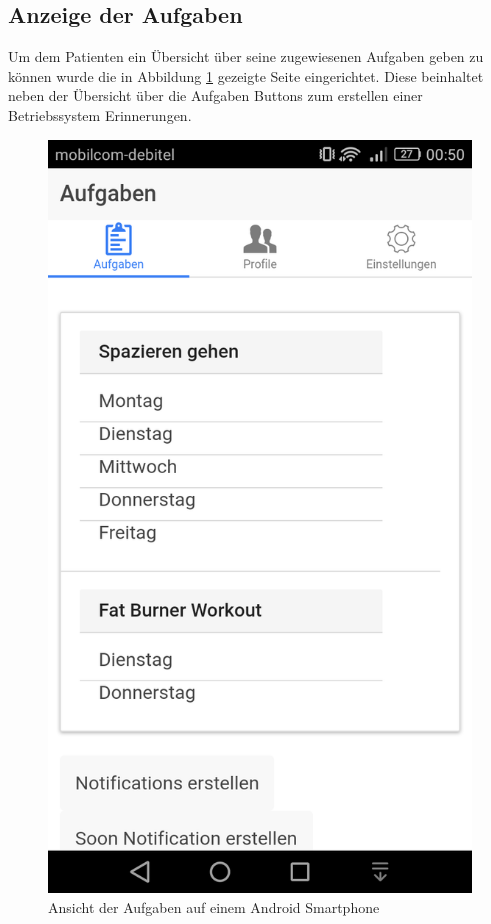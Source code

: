 \subsection{Anzeige der Aufgaben}
Um dem Patienten ein Übersicht über seine zugewiesenen Aufgaben geben zu können wurde die in Abbildung \ref{PatientClient_AufgabenUebersicht} gezeigte Seite eingerichtet. Diese beinhaltet neben der Übersicht über die Aufgaben Buttons zum erstellen einer Betriebssystem Erinnerungen. 

\begin{figure}[H]
	\centering
	\includegraphics[scale=0.25]{images/Screenshots/PatientClient/AufgabenUebersicht}
	\caption[Ansicht der Aufgaben auf einem Android Smartphone]{Ansicht der Aufgaben auf einem Android Smartphone}
	\label{PatientClient_AufgabenUebersicht}
\end{figure}

